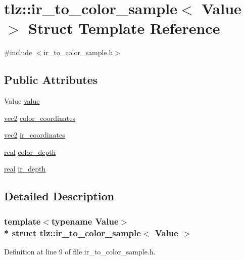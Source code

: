 \hypertarget{structtlz_1_1ir__to__color__sample}{}\section{tlz\+:\+:ir\+\_\+to\+\_\+color\+\_\+sample$<$ Value $>$ Struct Template Reference}
\label{structtlz_1_1ir__to__color__sample}


{\ttfamily \#include $<$ir\+\_\+to\+\_\+color\+\_\+sample.\+h$>$}

\subsection*{Public Attributes}
\begin{DoxyCompactItemize}
\item 
Value \hyperlink{structtlz_1_1ir__to__color__sample_a8c2eaf0c1dfbd3a6ddaf35482f92df30}{value}
\item 
\hyperlink{namespacetlz_ae192989bfbe6c700ac84d2a8cf05ebb4}{vec2} \hyperlink{structtlz_1_1ir__to__color__sample_ae93e5fa29e82dd8ba7a157e06563dfc7}{color\+\_\+coordinates}
\item 
\hyperlink{namespacetlz_ae192989bfbe6c700ac84d2a8cf05ebb4}{vec2} \hyperlink{structtlz_1_1ir__to__color__sample_ade7d220f572d24c176c79f4babb168b3}{ir\+\_\+coordinates}
\item 
\hyperlink{namespacetlz_a15fd37cce97f2b8b606af18c2615f602}{real} \hyperlink{structtlz_1_1ir__to__color__sample_a1b39105fe64f453fe447bab716082a3a}{color\+\_\+depth}
\item 
\hyperlink{namespacetlz_a15fd37cce97f2b8b606af18c2615f602}{real} \hyperlink{structtlz_1_1ir__to__color__sample_a702120f1e4d631a23b62b7d56607b49c}{ir\+\_\+depth}
\end{DoxyCompactItemize}


\subsection{Detailed Description}
\subsubsection*{template$<$typename Value$>$\\*
struct tlz\+::ir\+\_\+to\+\_\+color\+\_\+sample$<$ Value $>$}



Definition at line 9 of file ir\+\_\+to\+\_\+color\+\_\+sample.\+h.



